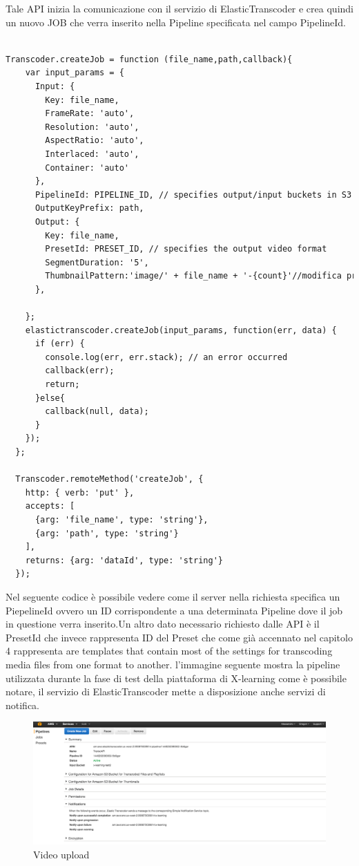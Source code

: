  Tale API inizia la comunicazione con il servizio di ElasticTranscoder e crea quindi un nuovo JOB che verra inserito nella Pipeline specificata nel campo PipelineId.
\begin{lstlisting}[language=html]
  
Transcoder.createJob = function (file_name,path,callback){
    var input_params = {
      Input: { 
        Key: file_name, 
        FrameRate: 'auto', 
        Resolution: 'auto', 
        AspectRatio: 'auto', 
        Interlaced: 'auto', 
        Container: 'auto' 
      }, 
      PipelineId: PIPELINE_ID, // specifies output/input buckets in S3 
      OutputKeyPrefix: path,
      Output: { 
        Key: file_name, 
        PresetId: PRESET_ID, // specifies the output video format
        SegmentDuration: '5',
        ThumbnailPattern:'image/' + file_name + '-{count}'//modifica preset per determinare il numero di immagini
      },

    };    
    elastictranscoder.createJob(input_params, function(err, data) {
      if (err) {
        console.log(err, err.stack); // an error occurred
        callback(err);
        return;
      }else{
        callback(null, data);
      }
    });
  };
  
  Transcoder.remoteMethod('createJob', {
    http: { verb: 'put' },
    accepts: [
      {arg: 'file_name', type: 'string'},
      {arg: 'path', type: 'string'}
    ],
    returns: {arg: 'dataId', type: 'string'}
  });
\end{lstlisting}

Nel seguente codice è possibile vedere come il server nella richiesta specifica un PiepelineId ovvero un ID corrispondente a una determinata Pipeline dove il job in questione verra inserito.Un altro dato necessario richiesto dalle API è il PresetId che invece rappresenta ID del Preset che come già accennato nel capitolo 4 rappresenta are templates that contain most of the settings for transcoding media files from one format to another.
l’immagine seguente mostra la pipeline utilizzata durante la fase di test della piattaforma di X-learning come è possibile notare, il servizio di ElasticTranscoder mette a disposizione anche  servizi di notifica.

\begin{figure}[htb]
 \centering
 \includegraphics[width=1.0\linewidth]{images/chapter6/elastic_pipeline.png}\hfill
 \caption[Web Components]{Video upload}
 \label{fig:fourV}
\end{figure}
